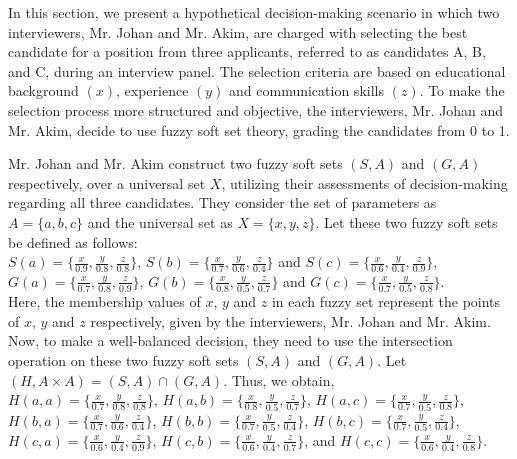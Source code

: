 \documentclass{article}
\theoremstyle{definition}
\begin{document}
In this section, we present a hypothetical decision-making scenario in which two interviewers, Mr. Johan and Mr. Akim, are charged with selecting the best candidate for a position from three applicants, referred to as candidates A, B, and C, during an interview panel. The selection criteria are based on educational background $(x)$, experience $(y)$ and communication skills $(z)$. To make the selection process more structured and objective, the interviewers, Mr. Johan and Mr. Akim, decide to use fuzzy soft set theory, grading the candidates from 0 to 1. 

Mr. Johan and Mr. Akim construct two fuzzy soft sets $(S, A)$ and $(G, A)$ respectively, over a universal set $X$, utilizing their assessments of decision-making regarding all three candidates. They consider the set of parameters as $A=\{a, b, c\}$ and the universal set as $X=\{x, y, z\}$. Let these two fuzzy soft sets be defined as follows:\\ 
$S(a)=\{\frac{x}{0.9}, \frac{y}{0.8}, \frac{z}{0.8}\}$, $S(b)=\{\frac{x}{0.7}, \frac{y}{0.6}, \frac{z}{0.4}\}$ and $S(c)=\{\frac{x}{0.6}, \frac{y}{0.4}, \frac{z}{0.9}\}$, \\$G(a)=\{\frac{x}{0.7}, \frac{y}{0.8}, \frac{z}{0.9}\}$, $G(b)=\{\frac{x}{0.8}, \frac{y}{0.5}, \frac{z}{0.7}\}$ and $G(c)=\{\frac{x}{0.7}, \frac{y}{0.5}, \frac{z}{0.8}\}$.\\

Here, the membership values of $x$, $y$ and $z$ in each fuzzy set represent the points of $x$, $y$ and $z$ respectively, given by the interviewers, Mr. Johan and Mr.  Akim. \\

Now, to make a well-balanced decision, they need to use the intersection operation on these two fuzzy soft sets $(S, A)$ and $(G, A)$. Let $(H, A\times A)=(S, A) \cap (G, A)$. Thus, we obtain,\\
 

 $H(a, a)=\{\frac{x}{0.7}, \frac{y}{0.8}, \frac{z}{0.8}\}$, $H(a, b)=\{\frac{x}{0.8}, \frac{y}{0.5}, \frac{z}{0.7}\}$, $H(a, c)=\{\frac{x}{0.7}, \frac{y}{0.5}, \frac{z}{0.8}\}$, $H(b, a)=\{\frac{x}{0.7}, \frac{y}{0.6}, \frac{z}{0.4}\}$, $H(b, b)=\{\frac{x}{0.7}, \frac{y}{0.5}, \frac{z}{0.4}\}$, $H(b, c)=\{\frac{x}{0.7}, \frac{y}{0.5}, \frac{z}{0.4}\}$,
 $H(c, a)=\{\frac{x}{0.6}, \frac{y}{0.4}, \frac{z}{0.9}\}$,
 $H(c, b)=\{\frac{x}{0.6}, \frac{y}{0.4}, \frac{z}{0.7}\}$, and
 $H(c, c)=\{\frac{x}{0.6}, \frac{y}{0.4}, \frac{z}{0.8}\}$.\\
 
\end{document}
